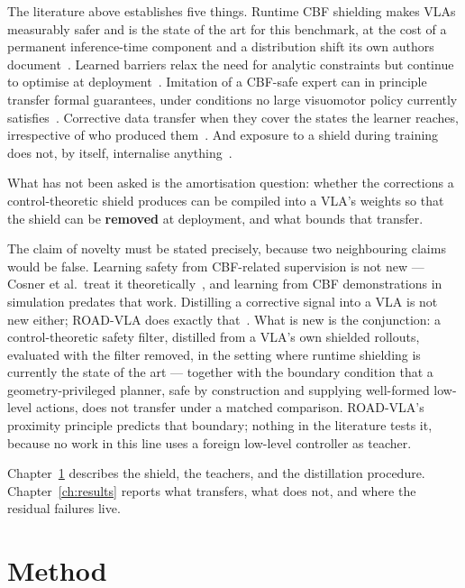 \documentclass[a4paper,11pt]{report}
\begin{document}
The literature above establishes five things. Runtime CBF shielding makes VLAs measurably safer and
is the state of the art for this benchmark, at the cost of a permanent inference-time component and
a distribution shift its own authors document~\cite{vlsa2026}. Learned barriers relax the need for
analytic constraints but continue to optimise at
deployment~\cite{meng2024conbat,sun2025lpb}. Imitation of a CBF-safe expert can in principle
transfer formal guarantees, under conditions no large visuomotor policy currently
satisfies~\cite{cosner2022il_cbf}. Corrective data transfer when they cover the states the learner
reaches, irrespective of who produced
them~\cite{ciftci2025safegil,hoque2024intervengen,wang2026roadvla}. And exposure to a shield during
training does not, by itself, internalise anything~\cite{guerrier2025guardrails}.

What has not been asked is the amortisation question: whether the corrections a control-theoretic
shield produces can be compiled into a VLA's weights so that the shield can be \textbf{removed} at
deployment, and what bounds that transfer.

The claim of novelty must be stated precisely, because two neighbouring claims would be false.
Learning safety from CBF-related supervision is not new --- Cosner et al.\ treat it
theoretically~\cite{cosner2022il_cbf}, and learning from CBF demonstrations in simulation predates
that work. Distilling a corrective signal into a VLA is not new either; ROAD-VLA does exactly
that~\cite{wang2026roadvla}. What is new is the conjunction: a control-theoretic safety filter,
distilled from a VLA's own shielded rollouts, evaluated with the filter removed, in the setting
where runtime shielding is currently the state of the art --- together with the boundary condition
that a geometry-privileged planner, safe by construction and supplying well-formed low-level
actions, does not transfer under a matched comparison. ROAD-VLA's proximity principle predicts that
boundary; nothing in the literature tests it, because no work in this line uses a foreign low-level
controller as teacher.

Chapter~\ref{ch:method} describes the shield, the teachers, and the distillation procedure.
Chapter~\ref{ch:results} reports what transfers, what does not, and where the residual failures
live.

\chapter{Method}\label{ch:method}
\end{document}
